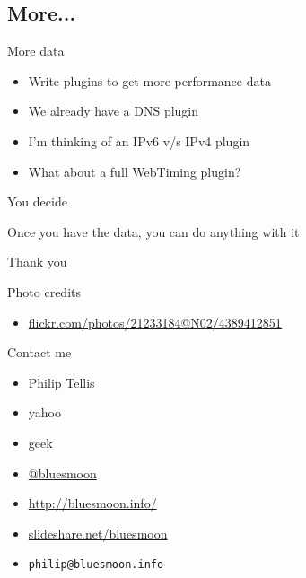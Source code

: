 \documentclass{beamer}
\begin{document}
\subsection{More...}

\begin{frame}{More data}
  \begin{itemize}
  \item Write plugins to get more performance data
  \item We already have a DNS plugin
  \item I'm thinking of an IPv6 v/s IPv4 plugin
  \item What about a full WebTiming plugin?
  \end{itemize}
\end{frame}

\begin{frame}{You decide}
  \begin{center}
  Once you have the data, you can do anything with it
  \end{center}
\end{frame}

\begin{frame}{}
  \begin{center}
  Thank you
  \end{center}
\end{frame}

\begin{frame}{Photo credits}
  \begin{itemize}
  \item \href{http://www.flickr.com/photos/21233184@N02/4389412851/}{flickr.com/photos/21233184@N02/4389412851}
  \end{itemize}
\end{frame}

\begin{frame}{Contact me}
  \begin{itemize}
  \item Philip Tellis
  \item yahoo
  \item geek
  \item \href{http://twitter.com/bluesmoon}{@bluesmoon}
  \item \href{http://bluesmoon.info/}{http://bluesmoon.info/}
  \item \href{http://www.slideshare.net/bluesmoon}{slideshare.net/bluesmoon}
  \item \small{\texttt{philip@bluesmoon.info}}
  \end{itemize}
\end{frame}
\end{document}
